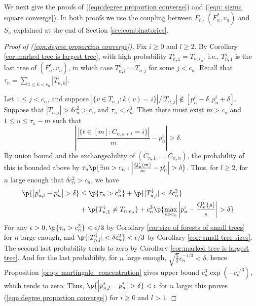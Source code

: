 We next give the proofs of (\ref{eqn:degree proportion converge}) and (\ref{eqn: sigma square converge}). 
In both proofs we use the coupling between $F_n$, $(F_n^*,v_n)$ and $S_n$ explained at the end of Section \ref{sec:combinatorics}. 

\begin{proof}[Proof of (\ref{eqn:degree proportion converge})]
Fix $i \ge 0$ and $l \ge 2$. By Corollary \ref{cor:marked tree is largest tree}, with high probability $T^{\downarrow}_{n,1}=T_{n,c_n}$, i.e., $T^{\downarrow}_{n,1}$ is the last tree of $(F_n^*,v_n)$, in which case $T_{n,l}^{\downarrow}=T_{n,j}$ for some $j < c_n$. Recall that $\tau_n=\sum_{1 \le k < c_n} |T_{n,k}|$. 

Let $1 \le j < c_n$, and suppose $|\{v \in T_{n,j}: k(v)=i\}|/|T_{n,j}| \not \in [p_n^i-\delta,p_n^i+\delta]$. Suppose that $|T_{n,j}| > \delta c_n^2 > c_n$ and $\tau_n<c^3_n$. Then there must exist $m>c_n$ and $1\le u\le \tau_n-m$ such that \[\left|\frac{\left|\{t\in[m]: C_{n,u+t}=i\}\right|}{m}-p^i_n\right|>\delta.\] By union bound and the exchangeability of $(C_{n,1},\ldots, C_{n,n})$, the probability of this is bounded above by $\tau_n\p{\exists m>c_n:\left|\frac{Q^i_n(m)}{m}-p^i_n\right|>\delta}$.
%
Thus, for $l \ge 2$, for $n$ large enough that $\delta c_n^2 > c_n$, we have 
\begin{align*}
\p{\left| p_{n,l}^i - p_n^i \right| > \delta} & 
\le 
\p{\tau_n > c_n^3} + \p{|T^{\downarrow}_{n,l}| < \delta c_n^2} 
\\
& 
+ \p{T^{\downarrow}_{n,1}\ne T_{n,c_n}} + c^3_n
\p{\max_{s > c_n} \left| p_n^i - \frac{Q_n^i(s)}{s} \right| > \delta}
\end{align*}
For any $\epsilon > 0, \p{\tau_n > c_n^3} < \epsilon/3$ by Corollary \ref{cor:size of forests of small trees} for $n$ large enough, and 
$\p{|T^{\downarrow}_{n,l}| < \delta c_n^2}< \epsilon/3$ by Corollary \ref{cor: small tree sizes}. The second last probability tends to zero by Corollary \ref{cor:marked tree is largest tree}. And for the last probability, for $n$ large enough, $\sqrt{\frac{5}{3}}c^{-1/3}_n<\delta$, hence Proposition \ref{prop: martingale_concentration} gives upper bound $c^3_n\exp\left(-c^{1/3}_n\right)$, which tends to zero. Thus, $\p{\left| p_{n,l}^i - p_n^i \right| > \delta} < \epsilon$ for $n$ large; this proves (\ref{eqn:degree proportion converge}) for $i \ge 0$ and $l > 1$.


\end{proof}
